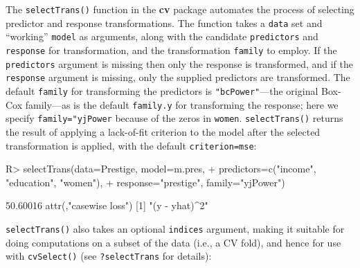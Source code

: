 \documentclass[
]{jss}
\begin{document}
The \texttt{selectTrans()} function in the \textbf{cv} package automates
the process of selecting predictor and response transformations. The
function takes a \texttt{data} set and ``working'' \texttt{model} as
arguments, along with the candidate \texttt{predictors} and
\texttt{response} for transformation, and the transformation
\texttt{family} to employ. If the \texttt{predictors} argument is
missing then only the response is transformed, and if the
\texttt{response} argument is missing, only the supplied predictors are
transformed. The default \texttt{family} for transforming the predictors
is \texttt{"bcPower"}---the original Box-Cox family---as is the default
\texttt{family.y} for transforming the response; here we specify
\texttt{family="yjPower} because of the zeros in \texttt{women}.
\texttt{selectTrans()} returns the result of applying a lack-of-fit
criterion to the model after the selected transformation is applied,
with the default \texttt{criterion=mse}:

\begin{CodeChunk}
\begin{CodeInput}
R> selectTrans(data=Prestige, model=m.pres,
+             predictors=c("income", "education", "women"),
+             response="prestige", family="yjPower")
\end{CodeInput}
\begin{CodeOutput}
[1] 50.60016
attr(,"casewise loss")
[1] "(y - yhat)^2"
\end{CodeOutput}
\end{CodeChunk}

\texttt{selectTrans()} also takes an optional \texttt{indices} argument,
making it suitable for doing computations on a subset of the data (i.e.,
a CV fold), and hence for use with \texttt{cvSelect()} (see
\texttt{?selectTrans} for details):
\end{document}
